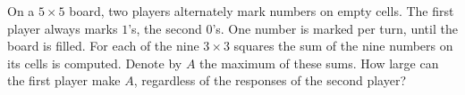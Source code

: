 On a $5 \times 5$ board, two players alternately mark numbers on empty cells. The first player always marks $1$'s, the second $0$'s. One number is marked per turn, until the board is filled. For each of the nine $3 \times 3$ squares the sum of the nine numbers on its cells is computed. Denote by $A$ the maximum of these sums. How large can the first player make $A$, regardless of the responses of the second player?
